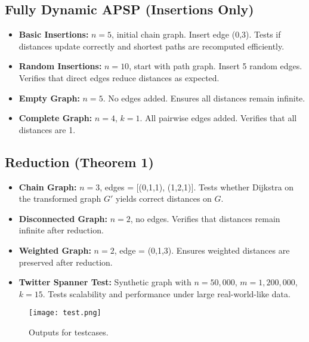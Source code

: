 \documentclass[11pt]{article}
\begin{document}
\subsection*{Fully Dynamic APSP (Insertions Only)}

\begin{itemize}
    \item \textbf{Basic Insertions:} $n = 5$, initial chain graph. Insert edge (0,3). Tests if distances update correctly and shortest paths are recomputed efficiently.
    
    \item \textbf{Random Insertions:} $n = 10$, start with path graph. Insert 5 random edges. Verifies that direct edges reduce distances as expected.
    
    \item \textbf{Empty Graph:} $n = 5$. No edges added. Ensures all distances remain infinite.
    
    \item \textbf{Complete Graph:} $n = 4$, $k = 1$. All pairwise edges added. Verifies that all distances are 1.
\end{itemize}

\subsection*{Reduction (Theorem 1)}

\begin{itemize}
    \item \textbf{Chain Graph:} $n = 3$, edges = [(0,1,1), (1,2,1)]. Tests whether Dijkstra on the transformed graph $G'$ yields correct distances on $G$.
    
    \item \textbf{Disconnected Graph:} $n = 2$, no edges. Verifies that distances remain infinite after reduction.
    
    \item \textbf{Weighted Graph:} $n = 2$, edge = (0,1,3). Ensures weighted distances are preserved after reduction.
    
    \item \textbf{Twitter Spanner Test:} Synthetic graph with $n = 50,000$, $m = 1,200,000$, $k = 15$. Tests scalability and performance under large real-world-like data.
\end{itemize}
\begin{figure}[h] %
    \centering
    \texttt{[image: test.png]} %
    \caption{Outputs for testcases.}
    \label{fig:sample}
\end{figure}
\end{document}
